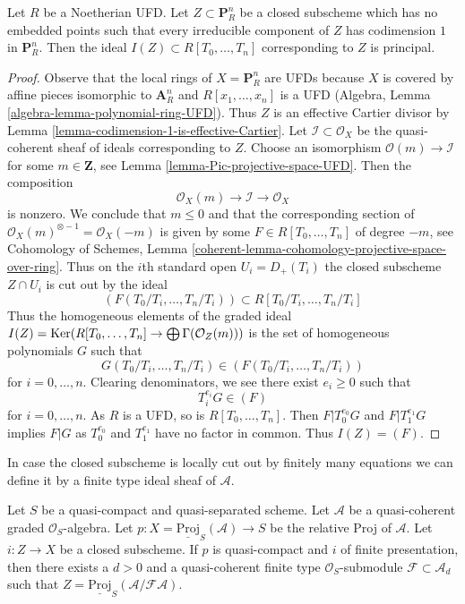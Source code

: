 \begin{lemma}
\label{lemma-equation-codim-1-in-projective-space}
Let $R$ be a Noetherian UFD. Let $Z \subset \mathbf{P}^n_R$ be a
closed subscheme
which has no embedded points such that every irreducible component
of $Z$ has codimension $1$ in $\mathbf{P}^n_R$.
Then the ideal $I(Z) \subset R[T_0, \ldots, T_n]$ corresponding
to $Z$ is principal.
\end{lemma}

\begin{proof}
Observe that the local rings of $X = \mathbf{P}^n_R$ are
UFDs because $X$ is covered by affine pieces isomorphic
to $\mathbf{A}^n_R$ and $R[x_1, \ldots, x_n]$ is a UFD
(Algebra, Lemma \ref{algebra-lemma-polynomial-ring-UFD}).
Thus $Z$ is an effective Cartier divisor by
Lemma \ref{lemma-codimension-1-is-effective-Cartier}.
Let $\mathcal{I} \subset \mathcal{O}_X$ be the quasi-coherent
sheaf of ideals corresponding to $Z$.
Choose an isomorphism $\mathcal{O}(m) \to \mathcal{I}$
for some $m \in \mathbf{Z}$, see
Lemma \ref{lemma-Pic-projective-space-UFD}.
Then the composition
$$
\mathcal{O}_X(m) \to \mathcal{I} \to \mathcal{O}_X
$$
is nonzero. We conclude that $m \leq 0$ and that the corresponding
section of $\mathcal{O}_X(m)^{\otimes -1} = \mathcal{O}_X(-m)$
is given by some $F \in R[T_0, \ldots, T_n]$ of degree $-m$, see
Cohomology of Schemes, Lemma
\ref{coherent-lemma-cohomology-projective-space-over-ring}.
Thus on the $i$th standard open $U_i = D_+(T_i)$ the
closed subscheme $Z \cap U_i$ is cut out by the ideal
$$
(F(T_0/T_i, \ldots, T_n/T_i)) \subset R[T_0/T_i, \ldots, T_n/T_i]
$$
Thus the homogeneous elements of the graded ideal
$I(Z) = \mathop{\mathrm{Ker}}(R[T_0, \ldots, T_n] \to \bigoplus \Gamma(\mathcal{O}_Z(m)))$
is the set of homogeneous polynomials $G$ such that
$$
G(T_0/T_i, \ldots, T_n/T_i) \in (F(T_0/T_i, \ldots, T_n/T_i))
$$
for $i = 0, \ldots, n$. Clearing denominators, we see there exist
$e_i \geq 0$ such that
$$
T_i^{e_i}G \in (F)
$$
for $i = 0, \ldots, n$. As $R$ is a UFD, so is $R[T_0, \ldots, T_n]$.
Then $F | T_0^{e_0}G$ and $F | T_1^{e_1}G$ implies $F | G$ as
$T_0^{e_0}$ and $T_1^{e_1}$ have no factor in common. Thus $I(Z) = (F)$.
\end{proof}

\noindent
In case the closed subscheme is locally cut out by finitely many
equations we can define it by a finite type ideal sheaf of
$\mathcal{A}$.

\begin{lemma}
\label{lemma-closed-subscheme-proj-finite}
Let $S$ be a quasi-compact and quasi-separated scheme.
Let $\mathcal{A}$ be a quasi-coherent graded $\mathcal{O}_S$-algebra. Let
$p : X = \underline{\text{Proj}}_S(\mathcal{A}) \to S$ be the relative
Proj of $\mathcal{A}$. Let $i : Z \to X$ be a closed subscheme.
If $p$ is quasi-compact and $i$ of finite presentation, then there exists
a $d > 0$ and a quasi-coherent finite type $\mathcal{O}_S$-submodule
$\mathcal{F} \subset \mathcal{A}_d$ such that
$Z = \underline{\text{Proj}}_S(\mathcal{A}/\mathcal{F}\mathcal{A})$.
\end{lemma}

